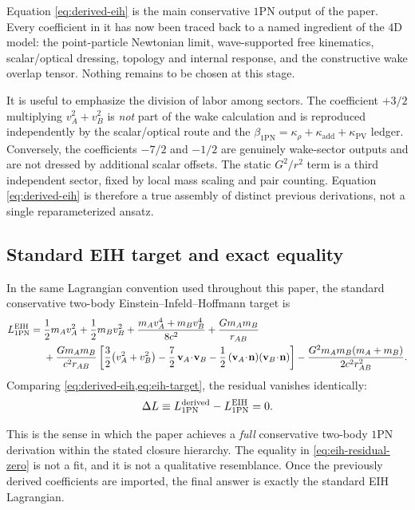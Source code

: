 \documentclass[11pt]{article}
\newcommand{\vct}{\mathbf v}
\newcommand{\nvec}{\mathbf n}
\newcommand{\kadd}{\kappa_{\mathrm{add}}}
\newcommand{\kPV}{\kappa_{\mathrm{PV}}}
\newcommand{\krho}{\kappa_{\rho}}
\newcommand{\betaPN}{\beta_{\mathrm{1PN}}}
\begin{document}
Equation \eqref{eq:derived-eih} is the main conservative \(1\)PN output of the paper.
Every coefficient in it has now been traced back to a named ingredient of the \(4\)D
model:
the point-particle Newtonian limit, wave-supported free kinematics, scalar/optical
dressing, topology and internal response, and the constructive wake overlap tensor.
Nothing remains to be chosen at this stage.

It is useful to emphasize the division of labor among sectors. The coefficient \(+3/2\)
multiplying \(v_A^2+v_B^2\) is \emph{not} part of the wake calculation and is reproduced
independently by the scalar/optical route and the
\(\betaPN=\krho+\kadd+\kPV\) ledger. Conversely, the coefficients \(-7/2\) and \(-1/2\)
are genuinely wake-sector outputs and are not dressed by additional scalar offsets. The
static \(G^2/r^2\) term is a third independent sector, fixed by local mass scaling and
pair counting. Equation \eqref{eq:derived-eih} is therefore a true assembly of distinct
previous derivations, not a single reparameterized ansatz.

\subsection{Standard EIH target and exact equality}
\label{sec:eih-target}

In the same Lagrangian convention used throughout this paper, the standard conservative
two-body Einstein--Infeld--Hoffmann target is
\begin{align}
L_{\rm 1PN}^{\rm EIH}
={}&
\frac12 m_A v_A^2 + \frac12 m_B v_B^2
+ \frac{m_A v_A^4 + m_B v_B^4}{8c^2}
+ \frac{Gm_A m_B}{r_{AB}}
\nonumber\\
&
+ \frac{Gm_A m_B}{c^2 r_{AB}}
\left[
\frac32\bigl(v_A^2+v_B^2\bigr)
-\frac72\,\vct_A\!\cdot\!\vct_B
-\frac12\,(\vct_A\!\cdot\!\nvec)(\vct_B\!\cdot\!\nvec)
\right]
- \frac{G^2m_A m_B(m_A+m_B)}{2c^2 r_{AB}^2}.
\label{eq:eih-target}
\end{align}
Comparing \cref{eq:derived-eih,eq:eih-target}, the residual vanishes identically:
\begin{equation}
\Delta L
\equiv
L_{\rm 1PN}^{\rm derived}-L_{\rm 1PN}^{\rm EIH}
=0.
\label{eq:eih-residual-zero}
\end{equation}

This is the sense in which the paper achieves a \emph{full} conservative two-body \(1\)PN
derivation within the stated closure hierarchy. The equality in
\cref{eq:eih-residual-zero} is not a fit, and it is not a qualitative resemblance. Once
the previously derived coefficients are imported, the final answer is exactly the standard
EIH Lagrangian.
\end{document}
